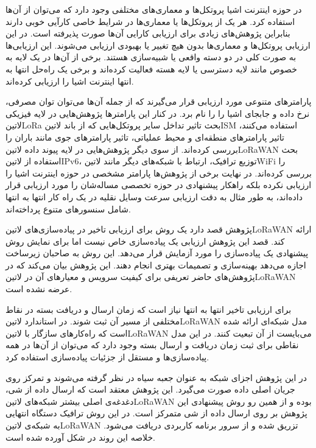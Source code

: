 
در حوزه اینترنت اشیا پروتکل‌ها و معماری‌های مختلفی وجود دارد که می‌توان از آن‌ها استفاده کرد. هر یک از پروتکل‌ها یا معماری‌ها در شرایط خاصی کارآیی خوبی دارند بنابراین پژوهش‌های زیادی برای ارزیابی کارایی آن‌ها صورت پذیرفته است.
در این ارزیابی پروتکل‌ها و معماری‌ها بدون هیچ تغییر یا بهبودی ارزیابی می‌شوند.
این ارزیابی‌ها به صورت کلی در دو دسته واقعی یا شبیه‌سازی هستند. برخی از آن‌ها در یک لایه به خصوص مانند لایه دسترسی یا لایه هسته فعالیت کرده‌اند و برخی یک راه‌حل انتها به انتها اینترنت اشیا را ارزیابی کرده‌اند.

پارامترهای متنوعی مورد ارزیابی قرار می‌گیرند که از جمله آن‌ها می‌توان توان مصرفی، نرخ داده و جابجای اشیا را را نام برد.
در کنار این پارامترها پژوهش‌هایی در لایه فیزیکی ‌لاتین{LoRa} بحث تاثیر تداخل سایر پروتکل‌هایی که از باند ‌لاتین{ISM} استفاده می‌کنند، تاثیر پارامترهای منطقه‌ای و محیط عملیاتی، تاثیر پارامتر‌های جوی مانند باران
را بررسی کرده‌اند.
از سوی دیگر پژوهش‌هایی در لایه پیوند داده ‌لاتین{LoRaWAN} بحث استفاده از ‌لاتین{IPv6}، توزیع ترافیک، ارتباط با شبکه‌های دیگر مانند ‌لاتین{WiFi} را بررسی کرده‌اند.
در نهایت برخی از پژوهش‌ها پارامتر مشخصی در حوزه اینترنت اشیا را ارزیابی نکرده بلکه راهکار پیشنهادی در حوزه تخصصی مساله‌شان را مورد ارزیابی قرار داده‌اند، به طور مثال به دقت ارزیابی سرعت
وسایل نقلیه در یک راه کار انتها به انتها شامل سنسورهای متنوع پرداخته‌اند.



پژوهش  قصد دارد یک روش برای ارزیابی تاخیر در پیاده‌سازی‌های ‌لاتین{LoRaWAN} ارائه کند.
قصد این پژوهش ارزیابی یک پیاده‌سازی خاص نیست
اما برای نمایش روش پیشنهادی یک پیاده‌سازی را مورد آزمایش قرار می‌دهد. این روش به صاحبان زیرساخت اجازه می‌دهد بهینه‌سازی و تصمیمات بهتری انجام دهند.
این پژوهش بیان می‌کند که در پژوهش‌های حاضر تعریفی برای کیفیت سرویس و معیارهای آن در ‌لاتین{LoRaWAN} عرضه نشده است.

برای ارزیابی تاخیر انتها به انتها نیاز است که زمان ارسال و دریافت بسته در نقاط مختلفی از مسیر آن ثبت شوند.
در استاندارد ‌لاتین{LoRaWAN} مدل شبکه‌ای ارائه شده است که راه‌کارهای سازگار با ‌لاتین{LoRaWAN} می‌بایست از آن تبعیت کنند.
در این مدل نقاطی برای ثبت زمان دریافت و ارسال بسته وجود دارد
که می‌توان از آن‌ها در همه پیاده‌سازی‌ها و مستقل از جزئیات پیاده‌سازی استفاده کرد.

در این پژوهش اجزای شبکه به عنوان جعبه سیاه در نظر گرفته می‌شوند و تمرکز روی جریان اصلی داده صورت می‌گیرد.
این پژوهش معتقد است که ارسال داده از شی، دغدغه‌ی اصلی بیشتر شبکه‌های ‌لاتین{LoRaWAN} بوده و از همین رو
روش پیشنهادی این پژوهش بر روی ارسال داده از شی متمرکز است.
در این روش ترافیک دستگاه انتهایی به شبکه‌ی ‌لاتین{LoRaWAN} تزریق شده و از سرور برنامه کاربردی دریافت می‌شود.
خلاصه این روند در شکل  آورده شده است.

